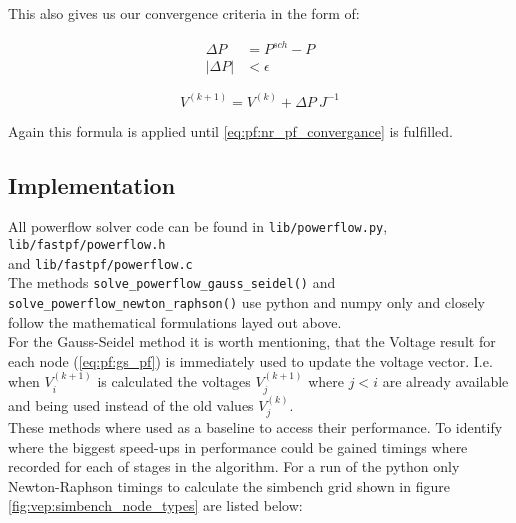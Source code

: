 This also gives us our convergence criteria in the form of:

\begin{align}
    \Delta P &= P^{sch} - P\\
    |\Delta P| &< \epsilon
    \label{eq:pf:nr_pf_convergance}
\end{align}

\begin{equation}
    V^{(k+1)} = V^{(k)} + \Delta P \ J^{-1}
    \label{eq:pf:nr_pf}
\end{equation}

Again this formula is applied until \ref{eq:pf:nr_pf_convergance} is fulfilled.

\subsection{Implementation}

All powerflow solver code can be found in 
\texttt{lib/powerflow.py}, \texttt{lib/fastpf/powerflow.h}
\\ and
\texttt{lib/fastpf/powerflow.c}\\

The methods \texttt{solve\_powerflow\_gauss\_seidel()}
and \texttt{solve\_powerflow\_newton\_raphson()}
use python and numpy only and closely follow the mathematical formulations layed out above.\\

For the Gauss-Seidel method it is worth mentioning, that the Voltage result for each
node (\ref{eq:pf:gs_pf}) is immediately used to update the voltage vector. I.e. when $V_i^{(k+1)}$
is calculated the voltages $V_{j}^{(k+1)}$ where $j<i$ are already available and being used instead of
the old values $V_{j}^{(k)}$.\\

These methods where used as a baseline to access their performance. To identify where the biggest
speed-ups in performance could be gained timings where recorded for each of stages in the algorithm.
For a run of the python only Newton-Raphson timings to calculate the simbench grid shown in figure
\ref{fig:vep:simbench_node_types} are listed below:

\vspace{.5cm}

